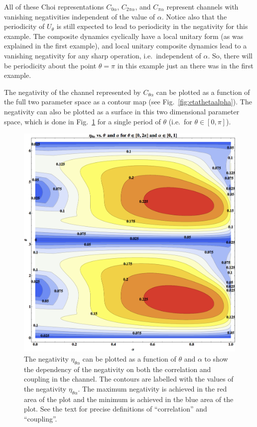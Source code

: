 All of these Choi representations $C_{0\alpha}$, $C_{2\pi\alpha}$, and $C_{\pi\alpha}$ represent channels with vanishing negativities independent of the value of $\alpha$.  Notice also that the periodicity of $U_\theta$ is still expected to lead to periodicity in the negativity for this example.  The composite dynamics cyclically have a local unitary form (as was explained in the first example), and local unitary composite dynamics lead to a vanishing negativity for any sharp operation, i.e.\ independent of $\alpha$.  So, there will be periodicity about the point $\theta=\pi$ in this example just an there was in the first example.

The negativity of the channel represented by $C_{\theta\alpha}$ can be plotted as a function of the full two parameter space as a contour map (see Fig.\ \ref{fig:etathetaalpha}).  The negativity can also be plotted as a surface in this two dimensional parameter space, which is done in Fig.\ \ref{fig:etathetaalphaAlso} for a single period of $\theta$ (i.e.\ for $\theta\in[0,\pi]$).
\begin{figure}[h!t]
\centering
\includegraphics[scale=0.32]{eatthetaalphaII.png}
\caption{The negativity $\eta_{\theta\alpha}$ can be plotted as a function of $\theta$ and $\alpha$ to show the dependency of the negativity on both the correlation and coupling in the channel.  The contours are labelled with the values of the negativity $\eta_{\theta\alpha}$.  The maximum negativity is achieved in the red area of the plot and the minimum is achieved in the blue area of the plot.  See the text for precise definitions of ``correlation'' and ``coupling''. }
\label{fig:etathetaalphaAlso}
\end{figure}

